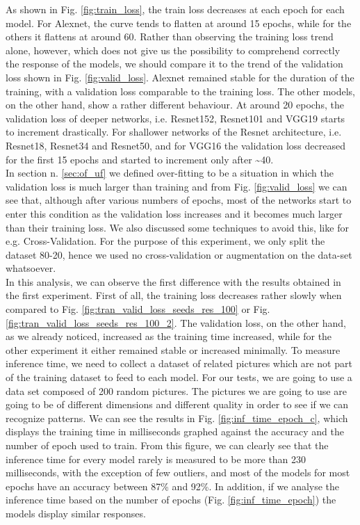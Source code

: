 As shown in Fig. \ref{fig:train_loss}, the train loss decreases at each epoch for each model. For Alexnet, the curve tends to flatten at around 15 epochs, while for the others it flattens at around 60. Rather than observing the training loss trend alone, however, which does not give us the possibility to comprehend correctly the response of the models, we should compare it to the trend of the validation loss shown in Fig. \ref{fig:valid_loss}. Alexnet remained stable for the duration of the training, with a validation loss comparable to the training loss. The other models, on the other hand, show a rather different behaviour. At around 20 epochs, the validation loss of deeper networks, i.e. Resnet152, Resnet101 and VGG19 starts to increment drastically. For shallower networks of the Resnet architecture, i.e. Resnet18, Resnet34 and Resnet50, and for VGG16 the validation loss decreased for the first 15 epochs and started to increment only after \textasciitilde40.\\
In section n. \ref{sec:of_uf} we defined over-fitting to be a situation in which the validation loss is much larger than training and from Fig. \ref{fig:valid_loss} we can see that, although after various numbers of epochs, most of the networks start to enter this condition as the validation loss increases and it becomes much larger than their training loss. We also discussed some techniques to avoid this, like for e.g. Cross-Validation. For the purpose of this experiment, we only split the dataset 80-20, hence we used no cross-validation or augmentation on the data-set whatsoever. \\
In this analysis, we can observe the first difference with the results obtained in the first experiment. First of all, the training loss decreases rather slowly when compared to Fig. \ref{fig:tran_valid_loss_seeds_res_100} or Fig.  \ref{fig:tran_valid_loss_seeds_res_100_2}. The validation loss, on the other hand, as we already noticed, increased as the training time increased, while for the other experiment it either remained stable or increased minimally.
To measure inference time, we need to collect a dataset of related pictures which are not part of the training dataset to feed to each model. For our tests, we are going to use a data set composed of 200 random pictures. The pictures we are going to use are going to be of different dimensions and different quality in order to see if we can recognize patterns. We can see the results in Fig. \ref{fig:inf_time_epoch_c}, which displays the training time in milliseconds graphed against the accuracy and the number of epoch used to train. From this figure, we can clearly see that the inference time for every model rarely is measured to be more than 230 milliseconds, with the exception of few outliers, and most of the models for most epochs have an accuracy between 87\% and 92\%. In addition, if we analyse the inference time based on the number of epochs (Fig. \ref{fig:inf_time_epoch}) the models display similar responses.  \\


